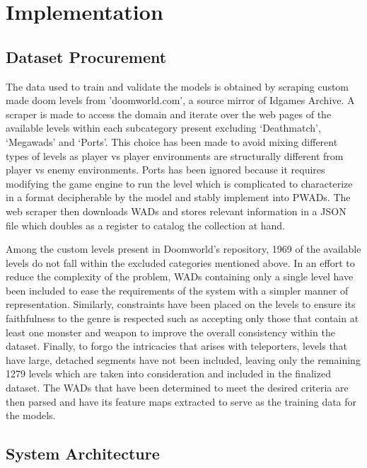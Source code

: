 \documentclass{Configuration_Files/PoliMi3i_thesis}
\begin{document}
\chapter{Implementation}
\label{ch:implementation}%

\section{Dataset Procurement}
The data used to train and validate the models is obtained by scraping custom made 
doom levels from 'doomworld.com', a source mirror of Idgames Archive. A scraper 
is made to access the domain and iterate over the web pages of the available levels 
within each subcategory present excluding ‘Deathmatch’, ‘Megawads’ and ‘Ports’.
This choice has been made to avoid mixing different types of levels as player vs 
player environments are structurally different from player vs enemy environments. 
Ports has been ignored because it requires modifying the game engine to run the 
level which is complicated to characterize in a format decipherable by the model and 
stably implement into PWADs. The web scraper then downloads WADs and stores 
relevant information in a JSON file which doubles as a register to catalog the 
collection at hand. 

Among the custom levels present in Doomworld’s repository, 1969 of the available 
levels do not fall within the excluded categories mentioned above. In an effort to 
reduce the complexity of the problem, WADs containing only a single level have 
been included to ease the requirements of the system with a simpler manner of 
representation. Similarly, constraints have been placed on the levels to ensure its 
faithfulness to the genre is respected such as accepting only those that contain at least 
one monster and weapon to improve the overall consistency within the dataset. 
Finally, to forgo the intricacies that arises with teleporters, levels that have large, 
detached segments have not been included, leaving only the remaining 1279 levels
which are taken into consideration and included in the finalized dataset. The WADs 
that have been determined to meet the desired criteria are then parsed and have its 
feature maps extracted to serve as the training data for the models.
\newpage

\section{System Architecture}
\end{document}
